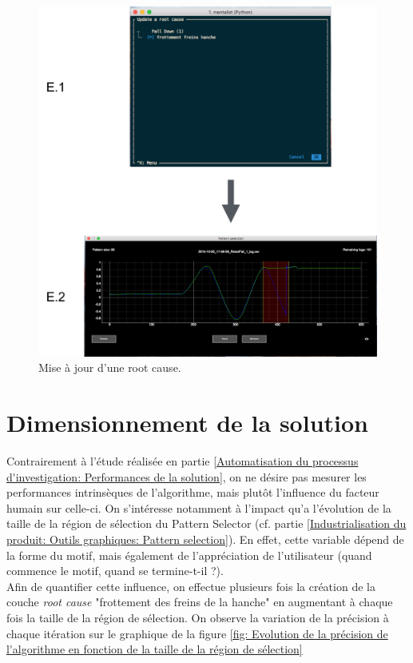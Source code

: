 \begin{figure}[H]
	\centering\includegraphics[width=15cm]{images/update_menu.png}
	\caption[Mise à jour d'une root cause]{Mise à jour d'une root cause.}
	\label{fig: Mise à jour d'une root cause}
\end{figure} 


\section{Dimensionnement de la solution}
\label{Industrialisation du produit: Dimensionnement de la solution}
Contrairement à l'étude réalisée en partie \ref{Automatisation du processus d'investigation: Performances de la solution}, on ne désire pas mesurer les performances intrinsèques de l'algorithme, mais plutôt l'influence du facteur humain sur celle-ci. On s'intéresse notamment à l'impact qu'a l'évolution de la taille de la région de sélection du Pattern Selector (cf. partie \ref{Industrialisation du produit: Outils graphiques: Pattern selection}). En effet, cette variable dépend de la forme du motif, mais également de l'appréciation de l'utilisateur (quand commence le motif, quand se termine-t-il ?). \\
Afin de quantifier cette influence, on effectue plusieurs fois la création de la couche \emph{root cause}  "frottement des freins de la hanche" en augmentant à chaque fois la taille de la région de sélection. On observe la variation de la précision à chaque itération sur le graphique de la figure \ref{fig: Evolution de la précision de l'algorithme en fonction de la taille de la région de sélection}

